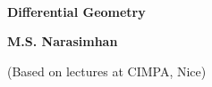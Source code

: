 \thispagestyle{empty}

~\phantom{a}
\vfill

\begin{center}
{\Large\bf Differential Geometry}\\[5pt]

\vskip 1cm

{\large\bf M.S. Narasimhan}

\vskip 1cm

(Based on lectures at CIMPA, Nice)

\end{center}

\vfill
\eject
